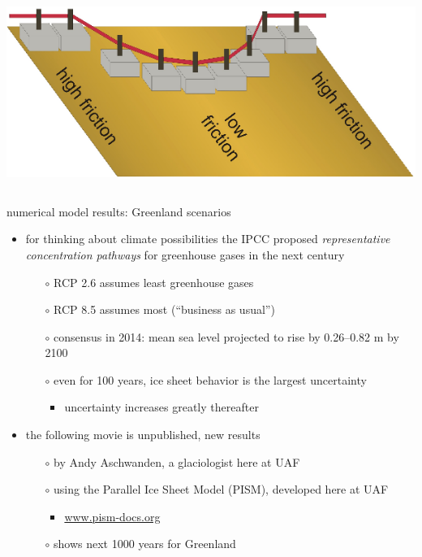 \documentclass[10pt,hyperref={pdfpagelabels=true}]{beamer}
\begin{document}
\begin{frame}
\begin{columns}
\begin{column}{0.4\textwidth}
\vspace{0.3in}

\includegraphics[width=1.1\textwidth]{schoof-sliders}
\end{column}
\end{columns}
\end{frame}


\begin{frame}{numerical model results: Greenland scenarios}

\begin{itemize}
\item for thinking about climate possibilities the IPCC proposed \emph{representative concentration pathways} for greenhouse gases in the next century
    \begin{itemize}
    \item[$\circ$] RCP 2.6 assumes least greenhouse gases
    \item[$\circ$] RCP 8.5 assumes most (``business as usual'')
    \item[$\circ$] consensus in 2014: mean sea level projected to rise by 0.26--0.82 m by 2100
    \item[$\circ$] even for 100 years, ice sheet behavior is the largest uncertainty
        \begin{itemize}
        \item uncertainty increases greatly thereafter
        \end{itemize}
    \end{itemize}
\item \alert{the following movie} is unpublished, new results
    \begin{itemize}
    \item[$\circ$] by Andy Aschwanden, a glaciologist here at UAF
    \item[$\circ$] using the Parallel Ice Sheet Model (PISM), developed here at UAF
        \begin{itemize}
        \item \url{www.pism-docs.org}
        \end{itemize}
    \item[$\circ$] shows next 1000 years for Greenland
    \end{itemize}
\end{itemize}
\end{frame}
\end{document}
